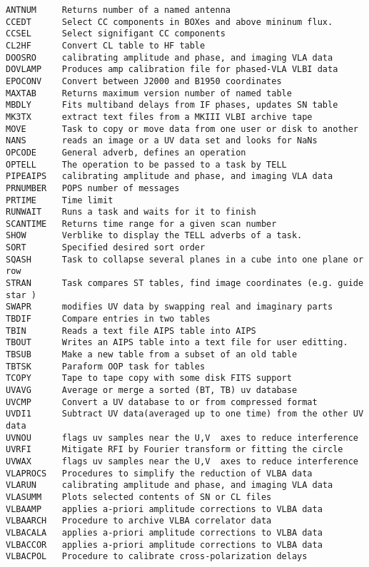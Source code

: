 \vskip 0.5pt
\bbve\begin{verbatim}
ANTNUM     Returns number of a named antenna
CCEDT      Select CC components in BOXes and above mininum flux.
CCSEL      Select signifigant CC components
CL2HF      Convert CL table to HF table
DOOSRO     calibrating amplitude and phase, and imaging VLA data
DOVLAMP    Produces amp calibration file for phased-VLA VLBI data
EPOCONV    Convert between J2000 and B1950 coordinates
MAXTAB     Returns maximum version number of named table
MBDLY      Fits multiband delays from IF phases, updates SN table
MK3TX      extract text files from a MKIII VLBI archive tape
MOVE       Task to copy or move data from one user or disk to another
NANS       reads an image or a UV data set and looks for NaNs
OPCODE     General adverb, defines an operation
OPTELL     The operation to be passed to a task by TELL
PIPEAIPS   calibrating amplitude and phase, and imaging VLA data
PRNUMBER   POPS number of messages
PRTIME     Time limit
RUNWAIT    Runs a task and waits for it to finish
SCANTIME   Returns time range for a given scan number
SHOW       Verblike to display the TELL adverbs of a task.
SORT       Specified desired sort order
SQASH      Task to collapse several planes in a cube into one plane or row
STRAN      Task compares ST tables, find image coordinates (e.g. guide star )
SWAPR      modifies UV data by swapping real and imaginary parts
TBDIF      Compare entries in two tables
TBIN       Reads a text file AIPS table into AIPS
TBOUT      Writes an AIPS table into a text file for user editting.
TBSUB      Make a new table from a subset of an old table
TBTSK      Paraform OOP task for tables
TCOPY      Tape to tape copy with some disk FITS support
UVAVG      Average or merge a sorted (BT, TB) uv database
UVCMP      Convert a UV database to or from compressed format
UVDI1      Subtract UV data(averaged up to one time) from the other UV data
UVNOU      flags uv samples near the U,V  axes to reduce interference
UVRFI      Mitigate RFI by Fourier transform or fitting the circle
UVWAX      flags uv samples near the U,V  axes to reduce interference
VLAPROCS   Procedures to simplify the reduction of VLBA data
VLARUN     calibrating amplitude and phase, and imaging VLA data
VLASUMM    Plots selected contents of SN or CL files
VLBAAMP    applies a-priori amplitude corrections to VLBA data
VLBAARCH   Procedure to archive VLBA correlator data
VLBACALA   applies a-priori amplitude corrections to VLBA data
VLBACCOR   applies a-priori amplitude corrections to VLBA data
VLBACPOL   Procedure to calibrate cross-polarization delays

\end{verbatim}
